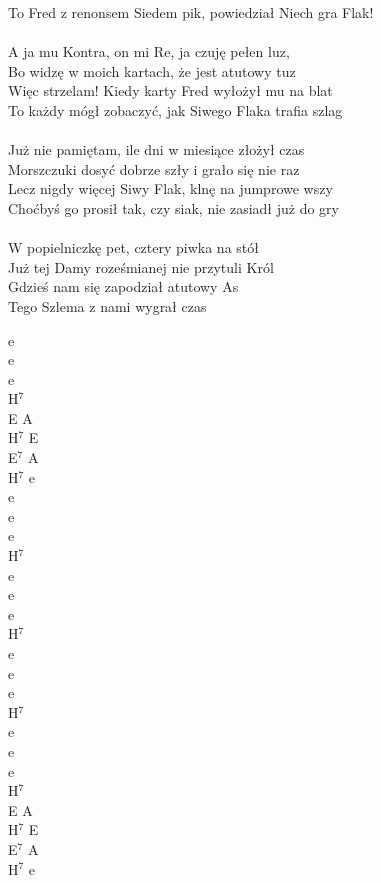 \documentclass[a5paper, 10pt]{book}
\begin{document}
\begin{minipage}[t]{0.85\textwidth}
To Fred z renonsem Siedem pik, powiedział Niech gra Flak!\\
\\
A ja mu Kontra, on mi Re, ja czuję pełen luz,\\
Bo widzę w moich kartach, że jest atutowy tuz\\
Więc strzelam! Kiedy karty Fred wyłożył mu na blat\\
To każdy mógł zobaczyć, jak Siwego Flaka trafia szlag\\
\\
Już nie pamiętam, ile dni w miesiące złożył czas\\
Morszczuki dosyć dobrze szły i grało się nie raz\\
Lecz nigdy więcej Siwy Flak, klnę na jumprowe wszy\\
Choćbyś go prosił tak, czy siak, nie zasiadł już do gry\\
\\
\hspace*{5mm}W popielniczkę pet, cztery piwka na stół\\
\hspace*{5mm}Już tej Damy roześmianej nie przytuli Król\\
\hspace*{5mm}Gdzieś nam się zapodział atutowy As\\
\hspace*{5mm}Tego Szlema z nami wygrał czas\\
\end{minipage}
\begin{minipage}[t]{0.15\textwidth}
e\\e\\e\\H$^7$\\

E A\\
H$^7$ E\\
E$^7$ A\\
H$^7$ e\\

e\\e\\e\\H$^7$\\

e\\e\\e\\H$^7$\\

e\\e\\e\\H$^7$\\

e\\e\\e\\H$^7$\\

E A\\
H$^7$ E\\
E$^7$ A\\
H$^7$ e\\

\end{minipage}
\end{document}
